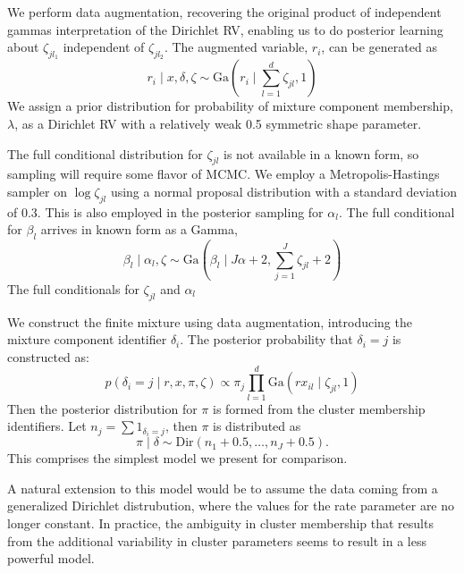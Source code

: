 We perform data augmentation, recovering the original product of independent gammas interpretation
  of the Dirichlet RV, enabling us to do posterior learning about $\zeta_{jl_1}$ independent of
  $\zeta_{jl_2}$.  The augmented variable, $r_i$, can be generated as
  \begin{equation}
    \label{eq:L1augmentation}
    r_i\mid x, \delta, \zeta \sim \text{Ga}(r_i \mid \sum_{l = 1}^d \zeta_{jl}, 1)
  \end{equation}
  We assign a prior distribution for probability of mixture component membership, $\lambda$, as a
  Dirichlet RV with a relatively weak 0.5 symmetric shape parameter.

The full conditional distribution for $\zeta_{jl}$ is not available in a known form, so sampling
  will require some flavor of MCMC.  We employ a Metropolis-Hastings sampler on $\log\zeta_{jl}$
  using a normal proposal distribution with a standard deviation of 0.3.  This is also employed in
  the posterior sampling for $\alpha_l$. The full conditional for $\beta_l$ arrives in known form
  as a Gamma,
  \begin{equation}
    \label{eq:betafc}
    \beta_l\mid \alpha_l, \zeta \sim \text{Ga}(\beta_l \mid J\alpha + 2, \sum_{j = 1}^J\zeta_{jl} + 2)
  \end{equation}
  The full conditionals for $\zeta_{jl}$ and $\alpha_l$ 

We construct the finite mixture using data augmentation, introducing the mixture component
  identifier $\delta_i$. The posterior probability that $\delta_i = j$ is constructed as:
  \begin{equation}
    \label{eq:finitemix}
    p(\delta_i = j \mid r, x, \pi, \zeta) \propto \pi_j\prod_{l = 1}^d\text{Ga}(rx_{il}\mid\zeta_{jl},1)
  \end{equation}
  Then the posterior distribution for $\pi$ is formed from the cluster membership identifiers.  Let
  $n_j = \sum 1_{\delta_i = j}$, then $\pi$ is distributed as
  \begin{equation}
    \pi \mid \delta \sim \text{Dir}(n_1 + 0.5, \ldots, n_J + 0.5).
  \end{equation}
  This comprises the simplest model we present for comparison.

A natural extension to this model would be to assume the data coming from a generalized Dirichlet
  distrubution, where the values for the rate parameter are no longer constant.  In practice, the
  ambiguity in cluster membership that results from the additional variability in cluster parameters
  seems to result in a less powerful model.


